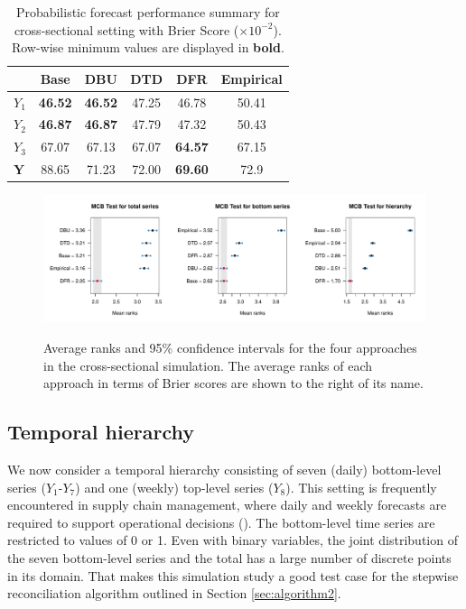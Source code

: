 \documentclass[a4paper,review,11pt,authoryear]{elsarticle}
\theoremstyle{definition}
\begin{document}
    \begin{table}
      \centering
      \caption{\label{tab:sim_crosssectional_res_dist} Probabilistic forecast performance summary for cross-sectional setting with Brier Score ($\times 10^{-2}$). Row-wise minimum values are displayed in \textbf{bold}.}
      \begin{tabular}{lccccc}
      \toprule
      ~ & Base & DBU & DTD & DFR & Empirical \\ \midrule
      $Y_1$ & \textbf{46.52} & \textbf{46.52} & 47.25 & 46.78 & 50.41 \\ 
      $Y_2$ & \textbf{46.87} & \textbf{46.87} & 47.79 & 47.32 & 50.43 \\ 
      $Y_3$ & 67.07 & 67.13 & 67.07 & \textbf{64.57} & 67.15 \\ 
      $\mathbf{Y}$ & 88.65 & 71.23 & 72.00 & \textbf{69.60} & 72.9 \\ 
      \bottomrule
      \end{tabular}
    \end{table}

    \begin{figure}
	\centering
	\caption{Average ranks and 95\% confidence intervals for the four approaches in the cross-sectional simulation. The average ranks of each approach in terms of Brier scores are shown to the right of its name.}
	\includegraphics[width=\textwidth]{figures/sim_cross_mcb.pdf}
    \label{fig:mcb_crosssectional} 
    \end{figure}


     \subsection{Temporal hierarchy}\label{sec:temporal_simu}
     We now consider a temporal hierarchy consisting of seven (daily) bottom-level series ($Y_1$-$Y_7$) and one (weekly) top-level series ($Y_8$).
     This setting is frequently encountered in supply chain management, where daily and weekly forecasts are required to support operational decisions (\citealp{syntetosSupplyChainForecasting2016}).
     The bottom-level time series are restricted to values of 0 or 1.
     Even with binary variables, the joint distribution of the seven bottom-level series and the total has a large number of discrete points in its domain. That makes this simulation study a good test case for the stepwise reconciliation algorithm outlined in Section \ref{sec:algorithm2}.
\end{document}
